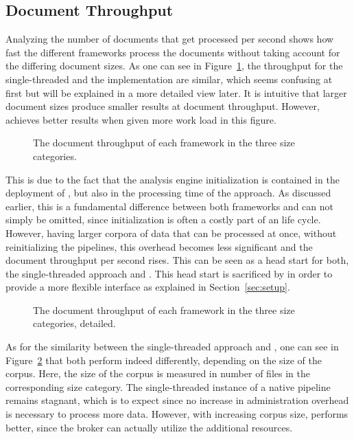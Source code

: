 \subsection{Document Throughput}
Analyzing the number of documents that get processed per second shows how fast the different frameworks process the documents without taking account for the differing document sizes. As one can see in Figure~\ref{fig:result:throughput}, the throughput for the single-threaded \uima{} and the \uimaas{} implementation are similar, which seems confusing at first but will be explained in a more detailed view later. It is intuitive that larger document sizes produce smaller results at document throughput. However, \spark{} achieves better results when given more work load in this figure.
\begin{figure}[!htb]
	\centering
	\resizebox{1.\linewidth}{!}{\small}
	\caption[The document throughput of each framework in the three size categories.]{The document throughput of each framework in the three size categories.}
	\label{fig:result:throughput}
\end{figure}
This is due to the fact that the analysis engine initialization is contained in the deployment of \uimaas{}, but also in the processing time of the \spark{} approach. As discussed earlier, this is a fundamental difference between both frameworks and can not simply be omitted, since initialization is often a costly part of an \anen{} life cycle. However, having larger corpora of data that can be processed at once, without reinitializing the pipelines, this overhead becomes less significant and the document throughput per second rises. This can be seen as a head start for both, the single-threaded approach and \uimaas{}. This head start is sacrificed by \spark{} in order to provide a more flexible interface as explained in Section~\ref{sec:setup}.
\begin{figure}[htb]
	\centering
	\resizebox{1.\linewidth}{!}{\small}
	\caption{The document throughput of each framework in the three size categories, detailed.}
	\label{fig:result:throughput_det}
\end{figure}
As for the similarity between the single-threaded approach and \uimaas{}, one can see in Figure~\ref{fig:result:throughput_det} that both perform indeed differently, depending on the size of the corpus. Here, the size of the corpus is measured in number of files in the corresponding size category. The single-threaded instance of a native \uima{} pipeline remains stagnant, which is to expect since no increase in administration overhead is necessary to process more data. However, with increasing corpus size, \uimaas{} performs better, since the broker can actually utilize the additional resources.

